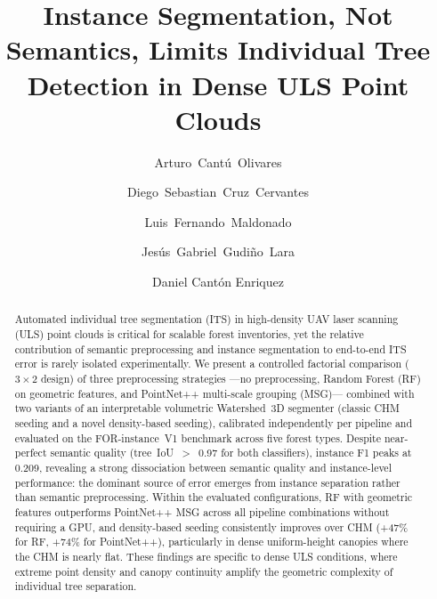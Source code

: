\documentclass[runningheads]{llncs}
\begin{document}
\title{Instance Segmentation, Not Semantics, Limits Individual Tree Detection in Dense ULS Point Clouds}

\author{Arturo~Cant\'u~Olivares \and
Diego~Sebastian~Cruz~Cervantes \and
Luis~Fernando~Maldonado \and
Jes\'us~Gabriel~Gudi\~no~Lara \and
Daniel Cantón Enriquez}



\maketitle

\begin{abstract}
Automated individual tree segmentation (ITS) in high-density UAV laser scanning (ULS) point clouds is critical for scalable forest inventories, yet the relative contribution of semantic preprocessing and instance segmentation to end-to-end ITS error is rarely isolated experimentally. We present a controlled factorial comparison ($3 \times 2$ design) of three preprocessing strategies ---no preprocessing, Random Forest (RF) on geometric features, and PointNet++ multi-scale grouping (MSG)--- combined with two variants of an interpretable volumetric Watershed~3D segmenter (classic CHM seeding and a novel density-based seeding), calibrated independently per pipeline and evaluated on the FOR-instance~V1 benchmark across five forest types. Despite near-perfect semantic quality (tree~IoU~$>$~0.97 for both classifiers), instance F1 peaks at 0.209, revealing a strong dissociation between semantic quality and instance-level performance: the dominant source of error emerges from instance separation rather than semantic preprocessing. Within the evaluated configurations, RF with geometric features outperforms PointNet++ MSG across all pipeline combinations without requiring a GPU, and density-based seeding consistently improves over CHM (+47\% for RF, +74\% for PointNet++), particularly in dense uniform-height canopies where the CHM is nearly flat. These findings are specific to dense ULS conditions, where extreme point density and canopy continuity amplify the geometric complexity of individual tree separation.

\end{abstract}
\end{document}
